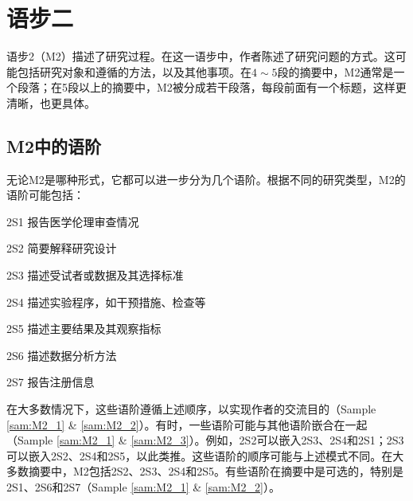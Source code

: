 \documentclass[a4paper]{ctexbook}
\begin{document}
\chapter{语步二}\label{chapter4}

语步2（M2）描述了研究过程。在这一语步中，作者陈述了研究问题的方式。这可能包括研究对象和遵循的方法，以及其他事项。在$4\sim 5$段的摘要中，M2通常是一个段落；在5段以上的摘要中，M2被分成若干段落，每段前面有一个标题，这样更清晰，也更具体。

\section{M2中的语阶}

无论M2是哪种形式，它都可以进一步分为几个语阶。根据不同的研究类型，M2的语阶可能包括：

2S1 报告医学伦理审查情况

2S2 简要解释研究设计

2S3 描述受试者或数据及其选择标准

2S4 描述实验程序，如干预措施、检查等

2S5 描述主要结果及其观察指标

2S6 描述数据分析方法

2S7 报告注册信息 

在大多数情况下，这些语阶遵循上述顺序，以实现作者的交流目的（Sample \ref{sam:M2_1} \& \ref{sam:M2_2}）。有时，一些语阶可能与其他语阶嵌合在一起（Sample \ref{sam:M2_1} \& \ref{sam:M2_3}）。例如，2S2可以嵌入2S3、2S4和2S1；2S3可以嵌入2S2、2S4和2S5，以此类推。这些语阶的顺序可能与上述模式不同。在大多数摘要中，M2包括2S2、2S3、2S4和2S5。有些语阶在摘要中是可选的，特别是2S1、2S6和2S7（Sample \ref{sam:M2_1} \& \ref{sam:M2_2}）。
\end{document}
